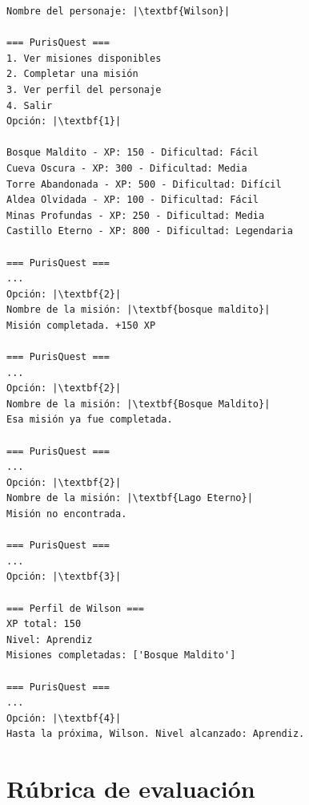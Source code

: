 \begin{verbatim}
Nombre del personaje: |\textbf{Wilson}|

=== PurisQuest ===
1. Ver misiones disponibles
2. Completar una misión
3. Ver perfil del personaje
4. Salir
Opción: |\textbf{1}|

Bosque Maldito - XP: 150 - Dificultad: Fácil
Cueva Oscura - XP: 300 - Dificultad: Media
Torre Abandonada - XP: 500 - Dificultad: Difícil
Aldea Olvidada - XP: 100 - Dificultad: Fácil
Minas Profundas - XP: 250 - Dificultad: Media
Castillo Eterno - XP: 800 - Dificultad: Legendaria

=== PurisQuest ===
...
Opción: |\textbf{2}|
Nombre de la misión: |\textbf{bosque maldito}|
Misión completada. +150 XP

=== PurisQuest ===
...
Opción: |\textbf{2}|
Nombre de la misión: |\textbf{Bosque Maldito}|
Esa misión ya fue completada.

=== PurisQuest ===
...
Opción: |\textbf{2}|
Nombre de la misión: |\textbf{Lago Eterno}|
Misión no encontrada.

=== PurisQuest ===
...
Opción: |\textbf{3}|

=== Perfil de Wilson ===
XP total: 150
Nivel: Aprendiz
Misiones completadas: ['Bosque Maldito']

=== PurisQuest ===
...
Opción: |\textbf{4}|
Hasta la próxima, Wilson. Nivel alcanzado: Aprendiz.
\end{verbatim}

\section*{{\small \faClipboardCheck\;} Rúbrica de evaluación}

